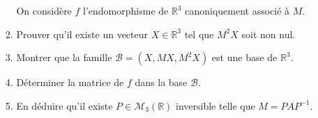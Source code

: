 \documentclass[twoside,french,11pt]{VcCours}
\begin{document}
\begin{enumerate}
\begin{enumerate}
\begin{enumerate}
  On considère $f$ l'endomorphisme de $\mathbb{R}^3$ canoniquement associé à $M$.
  \item Prouver qu'il existe un vecteur $X \in \mathbb{R}^3$ tel que $M^2X$ soit non nul.
  \item Montrer que la famille $\mathcal{B} = (X,MX,M^2X)$ est une base de $\mathbb{R}^3$.
  \item Déterminer la matrice de $f$ dans la base $\mathcal{B}$.
  \item En déduire qu'il existe $P \in \mathcal{M}_3(\mathbb{R})$ inversible telle que $M=PAP^{-1}$.
  \end{enumerate}
  \end{enumerate}
  \end{enumerate}
    

  
\end{document}
